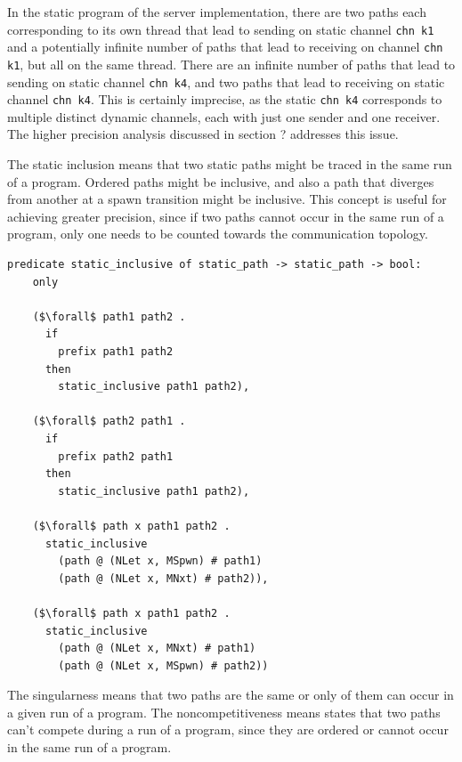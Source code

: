 \documentclass{article}
\begin{document}
In the static program of the server implementation, there are two paths each corresponding to its
own thread that lead
to sending on
static channel \lstinline[language=sugar_lang]{chn k1} and a potentially infinite number of
paths that lead to receiving on
channel \lstinline[language=sugar_lang]{chn k1}, but all on the same thread.
There are an infinite number of paths that lead
to sending on static channel \lstinline[language=sugar_lang]{chn k4}, and two paths
that lead to receiving on static channel
\lstinline[language=sugar_lang]{chn k4}. This is certainly imprecise,
as the static \lstinline[language=sugar_lang]{chn k4} corresponds to
multiple distinct dynamic channels, each with just one sender and one receiver.  The higher
precision analysis discussed in section ? addresses this issue.


The static inclusion means that two static paths might be traced in
the same run of a program. Ordered paths might be inclusive, and also a path that diverges
from another at a spawn transition might be inclusive. This concept is useful for achieving
greater precision, since if two paths cannot occur in the same run of a program, only one needs
to be counted towards the communication topology. 

\begin{lstlisting}[language=logic, mathescape]
  predicate static_inclusive of static_path -> static_path -> bool:
    only

    ($\forall$ path1 path2 .
      if
        prefix path1 path2
      then
        static_inclusive path1 path2),

    ($\forall$ path2 path1 .
      if
        prefix path2 path1
      then
        static_inclusive path1 path2),

    ($\forall$ path x path1 path2 .
      static_inclusive
        (path @ (NLet x, MSpwn) # path1)
        (path @ (NLet x, MNxt) # path2)),

    ($\forall$ path x path1 path2 .
      static_inclusive
        (path @ (NLet x, MNxt) # path1)
        (path @ (NLet x, MSpwn) # path2))
  \end{lstlisting}


The singularness means that two paths are the same or only of them can occur in a given run of
a program. The noncompetitiveness means states that two paths can't compete during a run of a
program, since they are ordered or cannot occur in the same run of a program.
\end{document}
